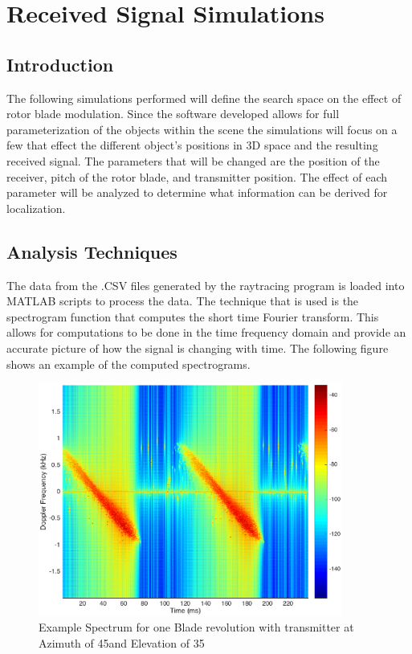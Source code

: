 \chapter{Received Signal Simulations} \label{ch:simulations}

\section{Introduction}
The following simulations performed will define the search space on the effect of rotor blade modulation. Since the software developed allows for full parameterization of the objects within the scene the simulations will focus on a few that effect the different object's positions in 3D space and the resulting received signal. The parameters that will be changed are the position of the receiver, pitch of the rotor blade, and transmitter position. The effect of each parameter will be analyzed to determine what information can be derived for localization.


\section{Analysis Techniques}
The data from the .CSV files generated by the raytracing program is loaded into MATLAB scripts to process the data. The technique that is used is the spectrogram function that computes the short time Fourier transform. This allows for computations to be done in the time frequency domain and provide an accurate picture of how the signal is changing with time. The following figure \label{fig:test_spec} shows an example of the computed spectrograms.


\begin{figure}
	\begin{center}
		\includegraphics[width=10cm]{images/simulation/test_analysis_spectrogram.eps}
		\caption{Example Spectrum for one Blade revolution with transmitter at Azimuth of 45\textdegree \space and Elevation of 35\textdegree}
		\label{fig:test_spec}
	\end{center}
\end{figure}

